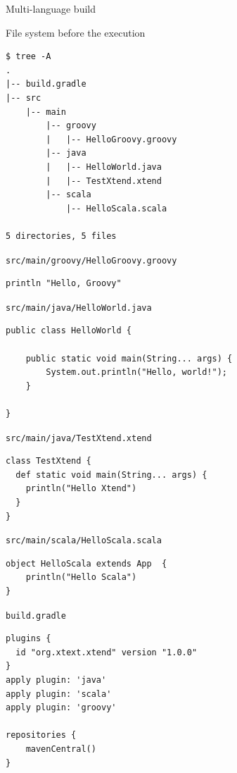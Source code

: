 \documentclass[presentation]{beamer}
\begin{document}
\begin{frame}{Multi-language build}
	\begin{block}{File system before the execution}
		\begin{verbatim}
$ tree -A
.
|-- build.gradle
|-- src
    |-- main
        |-- groovy
        |   |-- HelloGroovy.groovy
        |-- java
        |   |-- HelloWorld.java
        |   |-- TestXtend.xtend
        |-- scala
            |-- HelloScala.scala

5 directories, 5 files
		\end{verbatim}
	\end{block}
	\begin{block}{\texttt{src/main/groovy/HelloGroovy.groovy}}
		\begin{verbatim}
println "Hello, Groovy"
		\end{verbatim}
	\end{block}
	\begin{block}{\texttt{src/main/java/HelloWorld.java}}
		\begin{verbatim}
public class HelloWorld {

    public static void main(String... args) {
        System.out.println("Hello, world!");
    }
    
}
		\end{verbatim}
	\end{block}
	\begin{block}{\texttt{src/main/java/TestXtend.xtend}}
		\begin{verbatim}
class TestXtend {
  def static void main(String... args) {
    println("Hello Xtend")
  }
}
		\end{verbatim}
	\end{block}
	\begin{block}{\texttt{src/main/scala/HelloScala.scala}}
		\begin{verbatim}
object HelloScala extends App  {
    println("Hello Scala")
}
		\end{verbatim}
	\end{block}
	\begin{block}{\texttt{build.gradle}}
		\begin{verbatim}
plugins {
  id "org.xtext.xtend" version "1.0.0"
}
apply plugin: 'java'
apply plugin: 'scala'
apply plugin: 'groovy'

repositories {
    mavenCentral()
}


\end{verbatim}
\end{block}
\end{frame}
\end{document}
